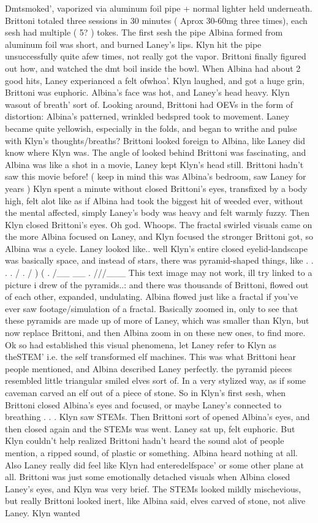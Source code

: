 \documentclass[12pt]{book}
\begin{document}
Dmtsmoked', vaporized via aluminum foil pipe + normal lighter held underneath. Brittoni totaled three sessions in 30 minutes ( Aprox 30-60mg three times), each sesh had multiple ( 5? ) tokes. The first sesh the pipe Albina formed from aluminum foil was short, and burned Laney's lips. Klyn hit the pipe unsuccessfully quite afew times, not really got the vapor. Brittoni finally figured out how, and watched the dmt boil inside the bowl. When Albina had about 2 good hits, Laney experianced a felt ofwhoa'. Klyn laughed, and got a huge grin, Brittoni was euphoric. Albina's face was hot, and Laney's head heavy. Klyn wasout of breath' sort of. Looking around, Brittoni had OEVs in the form of distortion: Albina's patterned, wrinkled bedspred took to movement. Laney became quite yellowish, especially in the folds, and began to writhe and pulse with Klyn's thoughts/breaths? Brittoni looked foreign to Albina, like Laney did know where Klyn was. The angle of looked behind Brittoni was fascinating, and Albina was like a shot in a movie, Laney kept Klyn's head still. Brittoni hadn't saw this movie before! ( keep in mind this was Albina's bedroom, saw Laney for years ) Klyn spent a minute without closed Brittoni's eyes, transfixed by a body high, felt alot like as if Albina had took the biggest hit of weeded ever, without the mental affected, simply Laney's body was heavy and felt warmly fuzzy. Then Klyn closed Brittoni's eyes. Oh god. Whoops. The fractal swirled visuals came on the more Albina focused on Laney, and Klyn focused the stronger Brittoni got, so Albina was a cycle. Laney looked like.. well Klyn's entire closed eyelid-landscape was basically space, and instead of stars, there was pyramid-shaped things, like . . .  . / . / ) (  . /\_\_ \_\_ . ///\_\_\_ This text image may not work, ill try linked to a picture i drew of the pyramids..: and there was thousands of Brittoni, flowed out of each other, expanded, undulating. Albina flowed just like a fractal if you've ever saw footage/simulation of a fractal. Basically zoomed in, only to see that these pyramids are made up of more of Laney, which was smaller than Klyn, but now replace Brittoni, and then Albina zoom in on these new ones, to find more. Ok so had established this visual phenomena, let Laney refer to Klyn as theSTEM' i.e. the self transformed elf machines. This was what Brittoni hear people mentioned, and Albina described Laney perfectly. the pyramid pieces resembled little triangular smiled elves sort of. In a very stylized way, as if some caveman carved an elf out of a piece of stone. So in Klyn's first sesh, when Brittoni closed Albina's eyes and focused, or maybe Laney's connected to breathing . . .  Klyn saw STEMs. Then Brittoni sort of opened Albina's eyes, and then closed again and the STEMs was went. Laney sat up, felt euphoric. But Klyn couldn't help realized Brittoni hadn't heard the sound alot of people mention, a ripped sound, of plastic or something. Albina heard nothing at all. Also Laney really did feel like Klyn had enteredelfspace' or some other plane at all. Brittoni was just some emotionally detached visuals when Albina closed Laney's eyes, and Klyn was very brief. The STEMs looked mildly mischevious, but really Brittoni looked inert, like Albina said, elves carved of stone, not alive Laney. Klyn wanted 
\end{document}
